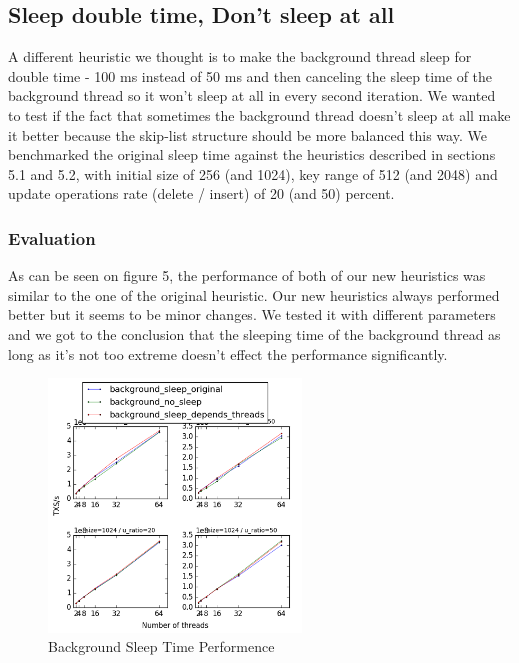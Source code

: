 \documentclass{article}
\begin{document}
\subsection{Sleep double time, Don't sleep at all}
\label{ssec:sdt}

A different heuristic we thought is to make the background thread sleep for double time - 100 ms instead of 50 ms and then canceling the sleep time of the background thread so it won't sleep at all in every second iteration.
We wanted to test if the fact that sometimes the background thread doesn't sleep at all make it better because the skip-list structure should be more balanced this way.
We benchmarked the original sleep time against the heuristics described in sections 5.1 and 5.2, with initial size of 256 (and 1024), key range of 512 (and 2048) and update operations rate (delete / insert) of 20 (and 50) percent. 

\subsubsection{Evaluation}
\label{sssec:dsrs-evl1}

 As can be seen on figure 5, the performance of both of our new heuristics was similar to the one of the original heuristic. Our new heuristics always performed better but it seems to be minor changes. We tested it with different parameters and we got to the conclusion that the sleeping time of the background thread as long as it's not too extreme doesn't effect the performance significantly.

\begin{figure}
	\caption{Background Sleep Time Performence}
	\centering
	\includegraphics[width=0.6\textwidth]{sleep_plot}
\end{figure}
\end{document}
